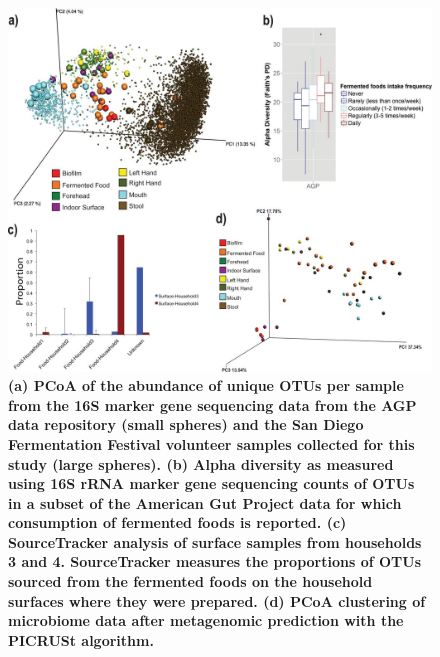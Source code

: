 \begin{figure}[htbp]
\includegraphics[width=\columnwidth]{chapter_48_hours_figures/F2.jpg}
\caption[(a) PCoA of the abundance of unique OTUs per sample from the 16S marker gene sequencing data from the AGP data repository (small spheres) and the San Diego Fermentation Festival volunteer samples collected for this study (large spheres). (b) Alpha diversity as measured using 16S rRNA marker gene sequencing counts of OTUs in a subset of the American Gut Project data for which consumption of fermented foods is reported. (c) SourceTracker analysis of surface samples from households 3 and 4. SourceTracker measures the proportions of OTUs sourced from the fermented foods on the household surfaces where they were prepared. (d) PCoA clustering of microbiome data after metagenomic prediction with the PICRUSt algorithm]{\textbf{(a) PCoA of the abundance of unique OTUs per sample from the 16S marker gene sequencing data from the AGP data repository (small spheres) and the San Diego Fermentation Festival volunteer samples collected for this study (large spheres). (b) Alpha diversity as measured using 16S rRNA marker gene sequencing counts of OTUs in a subset of the American Gut Project data for which consumption of fermented foods is reported. (c) SourceTracker analysis of surface samples from households 3 and 4. SourceTracker measures the proportions of OTUs sourced from the fermented foods on the household surfaces where they were prepared. (d) PCoA clustering of microbiome data after metagenomic prediction with the PICRUSt algorithm.}}
\label{rrfigure2}
\end{figure}

